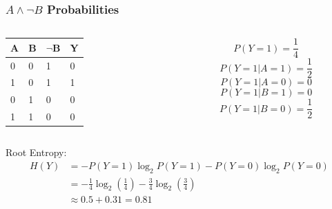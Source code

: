 \documentclass[aspectratio=169, 10pt]{beamer}
\begin{document}
\begin{frame}
\frametitle{$A \land \neg B$ Probabilities}
\small

\begin{columns}
    \begin{column}{0.5\textwidth}
        \begin{table}[]
            \begin{tabular}{lll|l}
            A & B & $\neg$B & Y \\ \hline
            0 & 0 & 1 & 0 \\
            1 & 0 & 1 & 1 \\
            0 & 1 & 0 & 0 \\
            1 & 1 & 0 & 0
            \end{tabular}
        \end{table}
    \end{column}
    \begin{column}{0.5\textwidth}
        \[ P(Y=1) = \frac{1}{4} \]
        \[ P(Y=1 | A=1) = \frac{1}{2} \]
        \[ P(Y=1 | A=0) = 0 \]
        \[ P(Y=1 | B=1) = 0 \]
        \[ P(Y=1 | B=0) = \frac{1}{2} \]
    \end{column}
\end{columns}

Root Entropy:
\[
    \begin{split}
        H(Y) & = -P(Y=1) \log_2 P(Y=1) -P(Y=0) \log_2 P(Y=0) \\
                   & = -\frac{1}{4} \log_2(\frac{1}{4}) -\frac{3}{4} \log_2(\frac{3}{4}) \\
                   & \approx 0.5 + 0.31 = 0.81
    \end{split}
\]

\end{frame}
\end{document}
